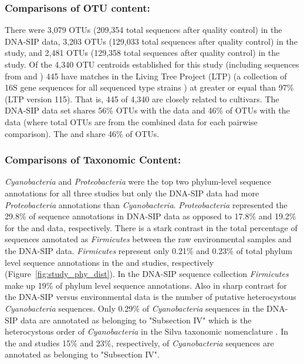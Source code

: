 \subsubsection{Comparisons of OTU content:} There were 3,079 OTUs (209,354
total sequences after quality control) in the DNA-SIP data, 3,203 OTUs (129,033
total sequences after quality control) in the \citet{Garcia_Pichel_2013} study,
and 2,481 OTUs (129,358 total sequences after quality control) in the
\citet{Steven_2013} study. Of the 4,340 OTU centroids established for this
study (including sequences from \citet{Steven_2013} and
\citet{Garcia_Pichel_2013}) 445 have matches in the Living Tree Project (LTP)
(a collection of 16S gene sequences for all sequenced type strains
\citep{Yarza_2008}) at greater or equal than 97\% (LTP version 115). That is,
445 of 4,340 are closely related to cultivars. The DNA-SIP data set shares 56\%
OTUs with the \citet{Steven_2013} data and 46\% of OTUs with the
\citet{Garcia_Pichel_2013} data (where total OTUs are from the combined data
for each pairwise comparison).  The \citet{Steven_2013} and
\citet{Garcia_Pichel_2013} share 46\% of OTUs.

\subsubsection{Comparisons of Taxonomic Content:} \textit{Cyanobacteria} and
\textit{Proteobacteria} were the top two phylum-level sequence annotations
for all three studies but only the DNA-SIP data had more
\textit{Proteobacteria} annotations than \textit{Cyanobacteria}.
\textit{Proteobacteria} represented the 29.8\% of sequence annotations in
DNA-SIP data as opposed to 17.8\% and 19.2\% for the \citet{Garcia_Pichel_2013}
and \citet{Steven_2013} data, respectively.  There is a stark contrast in the
total percentage of sequences annotated as \textit{Firmicutes} between the raw
environmental samples and the DNA-SIP data. \textit{Firmicutes} represent only
0.21\% and 0.23\% of total phylum level sequence annotations in the
\citet{Steven_2013} and \citet{Garcia_Pichel_2013} studies, respectively
(Figure~\ref{fig:study_phy_dist}). In the DNA-SIP sequence collection
\textit{Firmicutes} make up 19\% of phylum level sequence annotations. Also in
sharp contrast for the DNA-SIP versus environmental data is the number of
putative heterocystous \textit{Cyanobacteria} sequences. Only 0.29\% of
\textit{Cyanobacteria} sequences in the DNA-SIP data are annotated as belonging
to "Subsection IV" which is the heterocystous order of \textit{Cyanobacteria}
in the Silva taxonomic nomenclature \citep{17947321}. In the
\citet{Steven_2013} and \citet{Garcia_Pichel_2013} studies 15\% and 23\%,
respectively, of \textit{Cyanobacteria} sequences are annotated as belonging to
"Subsection
IV".  

